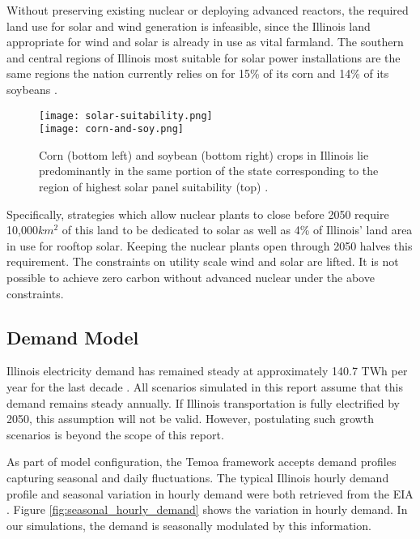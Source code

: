 Without preserving existing nuclear or deploying advanced reactors, the
required land use for solar and wind generation is infeasible, since the 
Illinois land appropriate for wind and solar is already in use as vital 
farmland. The southern and central regions of Illinois most suitable for solar 
power installations are the same regions the nation currently relies on for 
15\% of its corn and 14\% of its soybeans \cite{schleusener_illinois_2020}.  

\begin{figure}[htbp!]
        \begin{center}
                \texttt{[image: solar-suitability.png]}\\
                \vspace{0.5cm}
                \texttt{[image: corn-and-soy.png]}
        \end{center}
        \caption{Corn (bottom left) and soybean (bottom right) crops in Illinois lie predominantly in the 
        same portion of the state corresponding to the 
        region of highest solar panel suitability (top) 
        \cite{schleusener_illinois_2020,eispc_energy_2021,sengupta_national_2018}.}
        \label{fig:corn-and-soy}
\end{figure}


Specifically, strategies which allow nuclear plants to close before 2050 require 10,000$km^2$ of this land to be dedicated to solar as well as 4\% of Illinois' land area in use for rooftop solar. Keeping the nuclear plants open through 2050 halves this requirement.  
The constraints on utility scale wind and solar are lifted. It is not possible to achieve zero carbon without advanced nuclear under the above constraints.

\FloatBarrier
\subsection{Demand Model}
Illinois electricity demand has remained steady at approximately 140.7 TWh per 
year for the last decade 
\cite{us_energy_information_administration_eia_illinois_2020}. All scenarios 
simulated in this report assume that this demand remains steady annually.
If Illinois transportation is fully electrified by 2050, this assumption will 
not be valid.  However, postulating such growth scenarios is  beyond the scope 
of this report. 

As part of model configuration, the Temoa framework accepts demand profiles 
capturing seasonal and daily fluctuations. The typical Illinois hourly demand profile and seasonal variation in hourly demand were both retrieved from the \gls{EIA} 
\cite{us_energy_information_administration_eia_illinois_2020}. Figure 
\ref{fig:seasonal_hourly_demand} shows the variation in hourly demand.
In our simulations, the demand is seasonally modulated by this information.



